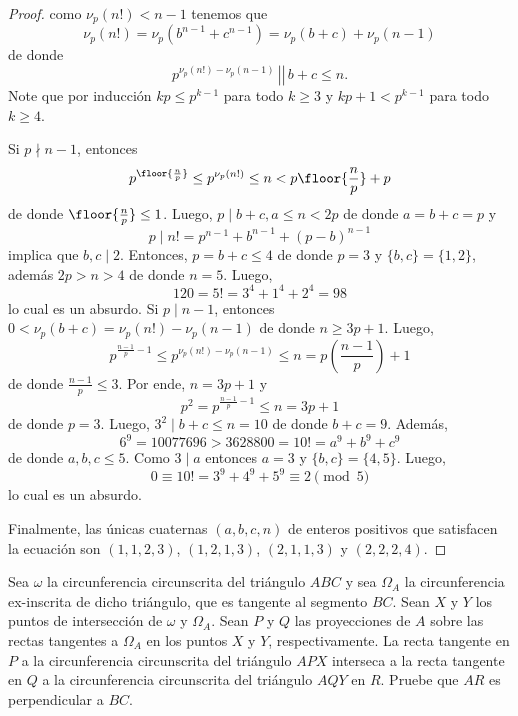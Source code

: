 \begin{proof}
  como $\nu_p(n!)<n-1$ tenemos que
  \[\nu_p(n!)=\nu_p(b^{n-1}+c^{n-1})=\nu_p(b+c)+\nu_p(n-1)\]
  de donde
  \[
    \left.\left.p^{\nu_p(n!)-\nu_p(n-1)}\,\right\rvert\!\right\rvert\,b+c
    \le n.
  \]
  Note que por inducción $kp\le p^{k-1}$ para todo $k\ge 3$ y $kp+1<p^{k-1}$
  para todo $k\ge 4$.
  \begin{itemize}
    \ii Si $p\nmid n-1$, entonces
    \[p^{\floor{\frac np}}\le p^{\nu_p(n!)}\le n<p\floor{\frac np}+p\]
    de donde $\floor{\frac np}\le 1$. Luego, $p\mid b+c,a\le n<2p$ de donde
    $a=b+c=p$ y
    \[p\mid n!=p^{n-1}+b^{n-1}+(p-b)^{n-1}\]
    implica que $b,c\mid 2$. Entonces, $p=b+c\le 4$ de donde $p=3$ y
    $\{b,c\}=\{1,2\}$, además $2p>n>4$ de donde $n=5$. Luego,
    \[120=5!=3^4+1^4+2^4=98\]
    lo cual es un absurdo.
    \ii Si $p\mid n-1$, entonces $0<\nu_p(b+c)=\nu_p(n!)-\nu_p(n-1)$ de donde
    $n\ge 3p+1$. Luego,
    \[
      p^{\frac{n-1}{p}-1}
      \le p^{\nu_p(n!)-\nu_p(n-1)}
      \le n
      =p\left(\frac{n-1}{p}\right)+1
    \]
    de donde $\frac{n-1}{p}\le 3$. Por ende, $n=3p+1$ y
    \[p^2=p^{\frac{n-1}{p}-1}\le n=3p+1\]
    de donde $p=3$. Luego, $3^2\mid b+c\le n=10$ de donde $b+c=9$. Además,
    \[6^9=10077696>3628800=10!=a^9+b^9+c^9\]
    de donde $a,b,c\le 5$. Como $3\mid a$ entonces $a=3$ y $\{b,c\}=\{4,5\}$.
    Luego,
    \[0\equiv 10!=3^9+4^9+5^9\equiv 2\pmod 5\]
    lo cual es un absurdo.
  \end{itemize}
  Finalmente, las únicas cuaternas $(a,b,c,n)$ de enteros positivos que
  satisfacen la ecuación son $(1,1,2,3)$, $(1,2,1,3)$, $(2,1,1,3)$ y
  $(2,2,2,4)$.
\end{proof}

\begin{probHR}
  Sea $\omega$ la circunferencia circunscrita del triángulo $ABC$ y sea
  $\Omega_A$ la circunferencia ex-inscrita de dicho triángulo, que es tangente
  al segmento $BC$. Sean $X$ y $Y$ los puntos de intersección de $\omega$ y
  $\Omega_A$. Sean $P$ y $Q$ las proyecciones de $A$ sobre las rectas tangentes
  a $\Omega_A$ en los puntos $X$ y $Y$, respectivamente. La recta tangente en
  $P$ a la circunferencia circunscrita del triángulo $APX$ interseca a la recta
  tangente en $Q$ a la circunferencia circunscrita del triángulo $AQY$ en $R$.
  Pruebe que $AR$ es perpendicular a $BC$.
\end{probHR}


